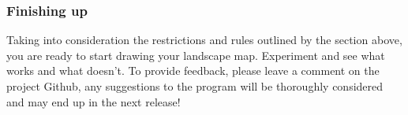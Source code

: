 \documentclass[11pt]{article}
\begin{document}
\subsubsection*{Finishing up}
Taking into consideration the restrictions and rules outlined by the
section above, you are ready to start drawing your landscape map.
Experiment and see what works and what doesn't. 
To provide feedback, please leave a comment on the project Github,
any suggestions to the program will be thoroughly considered and may
end up in the next release!

\newpage



\end{document}
